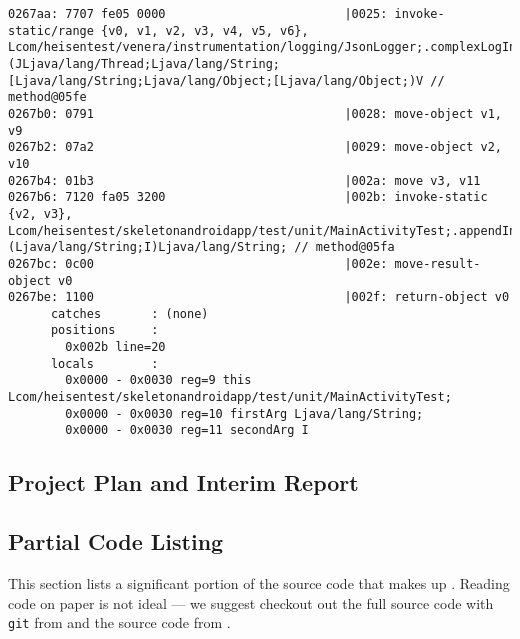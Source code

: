 \begin{lstlisting}
0267aa: 7707 fe05 0000                         |0025: invoke-static/range {v0, v1, v2, v3, v4, v5, v6}, Lcom/heisentest/venera/instrumentation/logging/JsonLogger;.complexLogInstanceMethodEntry:(JLjava/lang/Thread;Ljava/lang/String;[Ljava/lang/String;Ljava/lang/Object;[Ljava/lang/Object;)V // method@05fe
0267b0: 0791                                   |0028: move-object v1, v9
0267b2: 07a2                                   |0029: move-object v2, v10
0267b4: 01b3                                   |002a: move v3, v11
0267b6: 7120 fa05 3200                         |002b: invoke-static {v2, v3}, Lcom/heisentest/skeletonandroidapp/test/unit/MainActivityTest;.appendIntToString:(Ljava/lang/String;I)Ljava/lang/String; // method@05fa
0267bc: 0c00                                   |002e: move-result-object v0
0267be: 1100                                   |002f: return-object v0
      catches       : (none)
      positions     :
        0x002b line=20
      locals        :
        0x0000 - 0x0030 reg=9 this Lcom/heisentest/skeletonandroidapp/test/unit/MainActivityTest;
        0x0000 - 0x0030 reg=10 firstArg Ljava/lang/String;
        0x0000 - 0x0030 reg=11 secondArg I
\end{lstlisting}


\subsection{Project Plan and Interim Report}




\subsection{Partial Code Listing}

This section lists a significant portion of the source code that makes up
\venera. Reading code on paper is not ideal --- we suggest checkout out the full
\venera source code with {\tt git} from \cite{heisentestInstrumentation} and the
\jenkinsPlugin source code from \cite{heisentestPlugin}.

\begin{landscape}






\end{landscape}
